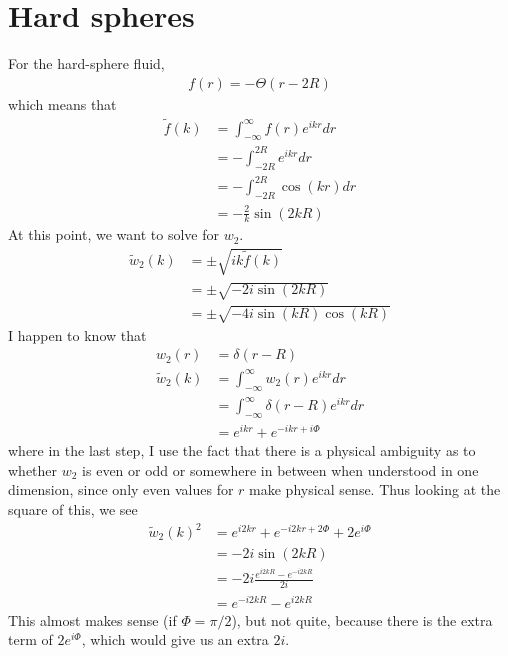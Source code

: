 \documentclass[letterpaper,twocolumn,amsmath,amssymb,prb]{revtex4-1}
\begin{document}
\section{Hard spheres}

For the hard-sphere fluid,
\begin{align}
  f(r) = - \Theta(r - 2R)
\end{align}
which means that
\begin{align}
  \tilde{f}(k) &= \int_{-\infty}^\infty f(r) e^{ikr} dr \\
  &= -\int_{-2R}^{2R} e^{ikr} dr \\
  &= -\int_{-2R}^{2R} \cos(kr) dr \\
  &= -\frac{2}{k}\sin(2kR)
\end{align}
At this point, we want to solve for $w_2$.
\begin{align}
  \tilde{w}_2(k) &= \pm \sqrt{ik\tilde{f}(k)} \\
  &= \pm \sqrt{-2i\sin(2kR)} \\
  &= \pm \sqrt{-4i\sin(kR)\cos(kR)}
\end{align}
I happen to know that
\begin{align}
  w_2(r) &= \delta(r - R) \\
  \tilde{w}_2(k) &= \int_{-\infty}^\infty w_2(r) e^{ikr} dr \\
  &= \int_{-\infty}^\infty \delta(r-R) e^{ikr} dr \\
  &= e^{ikr} + e^{-ikr + i\Phi}
\end{align}
where in the last step, I use the fact that there is a physical
ambiguity as to whether $w_2$ is even or odd or somewhere in between
when understood in one dimension, since only even values for $r$ make
physical sense.  Thus looking at the square of this, we see
\begin{align}
  \tilde{w}_2(k)^2 &= e^{i2kr} + e^{-i2kr + 2\Phi} + 2e^{i\Phi} \\
  &= -2i\sin(2kR) \\
  &= -2i\frac{e^{i2kR} - e^{-i2kR}}{2i} \\
  &= e^{-i2kR} - e^{i2kR}
\end{align}
This almost makes sense (if $\Phi = \pi/2$), but not quite, because
there is the extra term of $2e^{i\Phi}$, which would give us an extra
$2i$.
\end{document}
